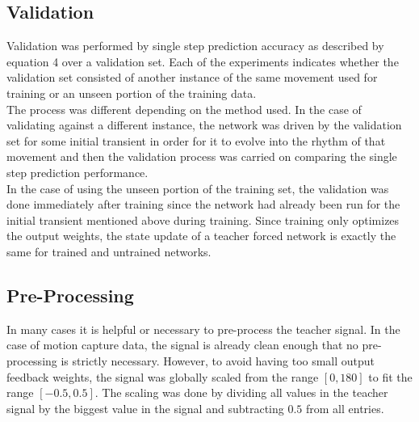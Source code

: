 \documentclass[letterpaper,9pt]{article}
\begin{document}


\subsection{Validation}

Validation was performed by single step prediction accuracy as described by equation 4 over a validation set. Each of the experiments indicates whether the validation set consisted of another instance of the same movement used for training or an unseen portion of the training data.\\

The process was different depending on the method used. In the case of validating against a different instance, the network was driven by the validation set for some initial transient in order for it to evolve into the rhythm of that movement and then the validation process was carried on comparing the single step prediction performance.\\

In the case of using the unseen portion of the training set, the validation was done immediately after training since the network had already been run for the initial transient mentioned above during training. Since training only optimizes the output weights, the state update of a teacher forced network is exactly the same for trained and untrained networks. 

\subsection{Pre-Processing}

In many cases it is helpful or necessary to pre-process the teacher signal. In the case of motion capture data, the signal is already clean enough that no pre-processing is strictly necessary. However, to avoid having too small output feedback weights, the signal was globally scaled from the range $[0,180]$ to fit the range $[-0.5,0.5]$. The scaling was done by dividing all values in the teacher signal by the biggest value in the signal and subtracting $0.5$ from all entries.  
\end{document}

